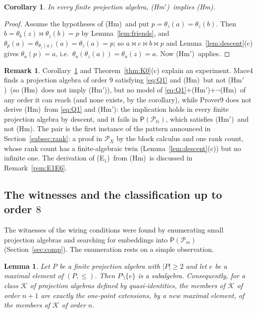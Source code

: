 \documentclass[11pt]{amsart}
\newtheorem{lemma}[theorem]{Lemma}
\newtheorem{corollary}[theorem]{Corollary}
\theoremstyle{definition}
\newtheorem{remark}[theorem]{Remark}
\renewcommand{\P}{\mathcal{P}}      %
\newcommand{\PA}{\mathsf{P}}         %
\newcommand{\mt}{\bowtie}      %
\newcommand{\Eone}{\textup{(E$_1$)}}
\newcommand{\Kzero}{\textup{(Hm)}}     %
\newcommand{\Hmp}{\textup{(Hm$'$)}}     %
\begin{document}
\begin{corollary}\label{cor:K0pp}
In every finite projection algebra, \Hmp\ implies \Kzero.
\end{corollary}

\begin{proof}
Assume the hypotheses of \Kzero\ and put $p=\theta_z(a)=\theta_z(b)$. Then $b=\theta_b(z)\mt\theta_z(b)=p$ by Lemma~\ref{lem:friends}, and $\theta_p(a)=\theta_{\theta_z(a)}(a)=\theta_z(a)=p$; so $a\mt c\mt b\mt p$ and Lemma~\ref{lem:descent}(c) gives $\theta_a(p)=a$, i.e.\ $\theta_a(\theta_z(a))=\theta_a(z)=a$. Now \Hmp\ applies.
\end{proof}

\begin{remark}\label{rem:K0pp}
Corollary~\ref{cor:K0pp} and Theorem~\ref{thm:K0}(c) explain an experiment. Mace4 finds a projection algebra of order $9$ satisfying \eqref{eq:Q1} and \Kzero\ but not \Hmp\ (so \Kzero\ does not imply \Hmp), but no model of \eqref{eq:Q1}$+$\Hmp$+\neg$\Kzero\ of any order it can reach (and none exists, by the corollary), while Prover9 does not derive \Kzero\ from \eqref{eq:Q1} and \Hmp: the implication holds in every finite projection algebra by descent, and it fails in $\PA(\P_{\mathbb N})$, which satisfies \Hmp\ and not \Kzero. The pair is the first instance of the pattern announced in Section~\ref{subsec:rank}: a proof in $\P_X$ by the block calculus and one rank count, whose rank count has a finite-algebraic twin (Lemma~\ref{lem:descent}(c)) but no infinite one. The derivation of \Eone\ from \Kzero\ is discussed in Remark~\ref{rem:E1E6}.
\end{remark}

\subsection{The witnesses and the classification up to order $8$}\label{subsec:census}

The witnesses of the wiring conditions were found by enumerating small projection algebras and searching for embeddings into $\PA(\P_m)$ (Section~\ref{sec:comp}). The enumeration rests on a simple observation.

\begin{lemma}\label{lem:extension}
Let $P$ be a finite projection algebra with $|P|\ge2$ and let $e$ be a maximal element of $(P,\le)$. Then $P\setminus\{e\}$ is a subalgebra. Consequently, for a class $\mathcal K$ of projection algebras defined by quasi-identities, the members of $\mathcal K$ of order $n+1$ are exactly the one-point extensions, by a new maximal element, of the members of $\mathcal K$ of order $n$.
\end{lemma}
\end{document}
